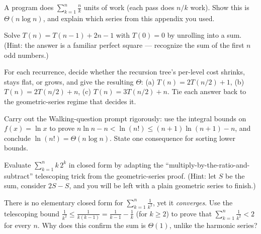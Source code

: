 \begin{exercise}
\label{ch37:ex7}
A program does $\sum_{k=1}^{n} \tfrac{n}{k}$ units of work (each pass does $n/k$
work). Show this is $\Theta(n \log n)$, and explain which series from this
appendix you used.
\end{exercise}

\begin{exercise}
\label{ch37:ex8}
Solve $T(n) = T(n-1) + 2n - 1$ with $T(0) = 0$ by unrolling into a sum. (Hint:
the answer is a familiar perfect square --- recognize the sum of the first $n$
odd numbers.)
\end{exercise}

\begin{exercise}
\label{ch37:ex9}
For each recurrence, decide whether the recursion tree's per-level cost shrinks,
stays flat, or grows, and give the resulting $\Theta$: (a) $T(n)=2T(n/2)+1$,
(b) $T(n)=2T(n/2)+n$, (c) $T(n)=3T(n/2)+n$. Tie each answer back to the
geometric-series regime that decides it.
\end{exercise}

\begin{exercise}
\label{ch37:ex10}
Carry out the Walking-question prompt rigorously: use the integral bounds on
$f(x)=\ln x$ to prove $n\ln n - n < \ln(n!) \le (n+1)\ln(n+1) - n$, and conclude
$\ln(n!) = \Theta(n\log n)$. State one consequence for sorting lower bounds.
\end{exercise}

\begin{exercise}
\label{ch37:ex11}
Evaluate $\sum_{k=1}^{n} k\,2^k$ in closed form by adapting the
``multiply-by-the-ratio-and-subtract'' telescoping trick from the geometric-series
proof. (Hint: let $S$ be the sum, consider $2S - S$, and you will be left with a
plain geometric series to finish.)
\end{exercise}

\begin{exercise}
\label{ch37:ex12}
There is no elementary closed form for $\sum_{k=1}^{n} \tfrac{1}{k^2}$, yet it
\emph{converges}. Use the telescoping bound $\tfrac{1}{k^2} \le
\tfrac{1}{k(k-1)} = \tfrac{1}{k-1} - \tfrac1k$ (for $k \ge 2$) to prove that
$\sum_{k=1}^{n}\tfrac{1}{k^2} < 2$ for every $n$. Why does this confirm the sum is
$\Theta(1)$, unlike the harmonic series?
\end{exercise}
